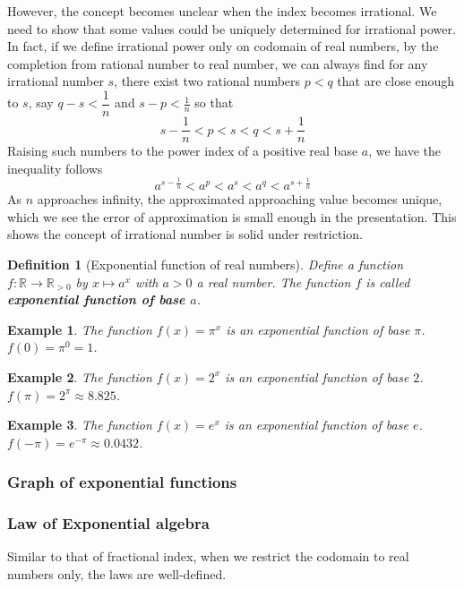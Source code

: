 \documentclass[12pt]{article}
\newtheorem{definition}{Definition}[section]
\newtheorem*{example}{Example}
\begin{document}
    However, the concept becomes unclear when the index becomes irrational. We need to show that some values could be uniquely determined for irrational power. In fact, if we define irrational power only on codomain of real numbers, by the completion from rational number to real number, we can always find for any irrational number $s$, there exist two rational numbers $p<q$ that are close enough to $s$, say $q-s<\dfrac{1}{n}$ and $s-p<\frac{1}{n}$ so that $$s-\frac{1}{n}<p<s<q<s+\frac{1}{n}$$
    Raising such numbers to the power index of a positive real base $a$, we have the inequality follows $$a^{s-\frac{1}{n}}<a^p<a^s<a^q<a^{s+\frac{1}{n}}$$
    As $n$ approaches infinity, the approximated approaching value becomes unique, which we see the error of approximation is small enough in the presentation. This shows the concept of irrational number is solid under restriction.

    \begin{definition}[Exponential function of real numbers]
        Define a function $f:\mathbb{R}\to\mathbb{R}_{>0}$ by $x\mapsto a^x$ with $a>0$ a real number. The function $f$ is called \textbf{exponential function of base $a$}.
    \end{definition}

    \begin{example}
        The function $f(x)=\pi^x$ is an exponential function of base $\pi$. $f(0)=\pi^0=1$.
    \end{example}

    \begin{example}
        The function $f(x)=2^x$ is an exponential function of base $2$. $f(\pi)=2^\pi\approx 8.825$.
    \end{example}

    \begin{example}
        The function $f(x)=e^x$ is an exponential function of base $e$. $f(-\pi)=e^{-\pi}\approx 0.0432$.
    \end{example}

    \subsubsection*{Graph of exponential functions}

    \subsubsection*{Law of Exponential algebra}

    Similar to that of fractional index, when we restrict the codomain to real numbers only, the laws are well-defined.
\end{document}
